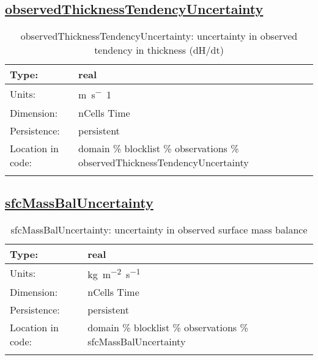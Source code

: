 \subsection[observedThicknessTendencyUncertainty]{\hyperref[sec:var_tab_observations]{observedThicknessTendencyUncertainty}}
\label{subsec:var_sec_observations_observedThicknessTendencyUncertainty}
\begin{center}
\begin{longtable}{| p{2.0in} | p{4.0in} |}
        \hline 
        Type: & real \\
        \hline 
        Units: & \si{m.s^-1} \\
        \hline 
        Dimension: & nCells Time \\
        \hline 
        Persistence: & persistent \\
        \hline 
         Location in code: & domain \% blocklist \% observations \% observedThicknessTendencyUncertainty \\
         \hline 
    \caption{observedThicknessTendencyUncertainty: uncertainty in observed tendency in thickness (dH/dt)}
\end{longtable}
\end{center}
\subsection[sfcMassBalUncertainty]{\hyperref[sec:var_tab_observations]{sfcMassBalUncertainty}}
\label{subsec:var_sec_observations_sfcMassBalUncertainty}
\begin{center}
\begin{longtable}{| p{2.0in} | p{4.0in} |}
        \hline 
        Type: & real \\
        \hline 
        Units: & \si{kg.m^{-2}.s^{-1}} \\
        \hline 
        Dimension: & nCells Time \\
        \hline 
        Persistence: & persistent \\
        \hline 
         Location in code: & domain \% blocklist \% observations \% sfcMassBalUncertainty \\
         \hline 
    \caption{sfcMassBalUncertainty: uncertainty in observed surface mass balance}
\end{longtable}
\end{center}
